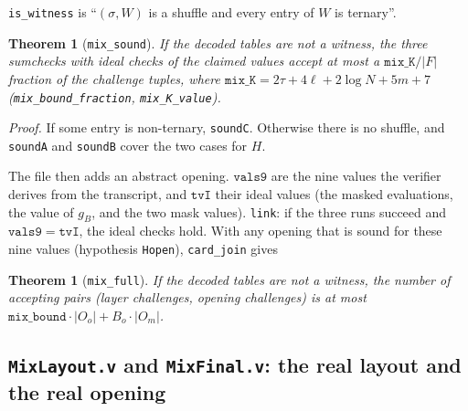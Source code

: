 \documentclass[11pt,a4paper]{article}
\theoremstyle{definition}
\theoremstyle{plain}
\newtheorem{theorem}[definition]{Theorem}
\begin{document}
\texttt{is\_witness} is ``$(\sigma,W)$ is a shuffle and every entry of $W$ is ternary''.
\begin{theorem}[\texttt{mix\_sound}]
If the decoded tables are not a witness, the three sumchecks with ideal checks of the claimed
values accept at most a $\mathtt{mix\_K}/|F|$ fraction of the challenge tuples, where
$\mathtt{mix\_K}=2\tau+4\ell+2\log N+5m+7$ (\texttt{mix\_bound\_fraction}, \texttt{mix\_K\_value}).
\end{theorem}
\emph{Proof.} If some entry is non-ternary, \texttt{soundC}. Otherwise there is no shuffle, and
\texttt{soundA} and \texttt{soundB} cover the two cases for $H$.

The file then adds an abstract opening. $\mathtt{vals9}$ are the nine values the verifier derives
from the transcript, and $\mathtt{tvI}$ their ideal values (the masked evaluations, the value of
$g_B$, and the two mask values). \texttt{link}: if the three runs succeed and $\mathtt{vals9}=\mathtt{tvI}$,
the ideal checks hold. With any opening that is sound for these nine values (hypothesis
\texttt{Hopen}), \texttt{card\_join} gives
\begin{theorem}[\texttt{mix\_full}]
If the decoded tables are not a witness, the number of accepting pairs (layer challenges, opening
challenges) is at most $\mathtt{mix\_bound}\cdot|O_o|+B_o\cdot|O_m|$.
\end{theorem}

\subsection{\texttt{MixLayout.v} and \texttt{MixFinal.v}: the real layout and the real opening}
\end{document}
